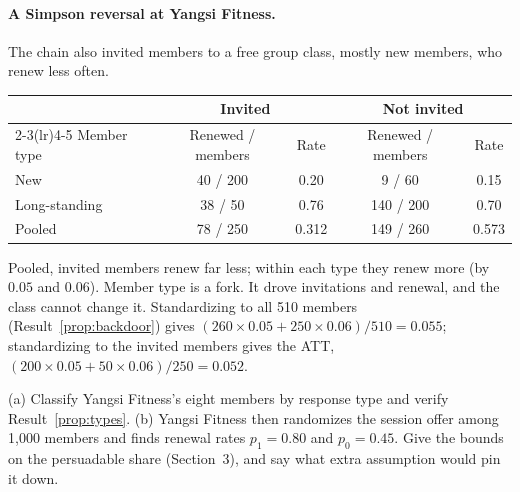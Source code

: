 \documentclass[11pt]{article}
\begin{document}
\paragraph{A Simpson reversal at Yangsi Fitness.} The chain also invited members to a free group class, mostly
new members, who renew less often.
\begin{center}
\begin{tabular}{lcccc}
\toprule
 & \multicolumn{2}{c}{Invited} & \multicolumn{2}{c}{Not invited} \\
\cmidrule(lr){2-3}\cmidrule(lr){4-5}
Member type & Renewed / members & Rate & Renewed / members & Rate \\
\midrule
New & 40 / 200 & 0.20 & 9 / 60 & 0.15 \\
Long-standing & 38 / 50 & 0.76 & 140 / 200 & 0.70 \\
\midrule
Pooled & 78 / 250 & 0.312 & 149 / 260 & 0.573 \\
\bottomrule
\end{tabular}
\end{center}
Pooled, invited members renew far less; within each type they renew more (by $0.05$ and $0.06$). Member
type is a fork. It drove invitations and renewal, and the class cannot change it. Standardizing to all 510
members (Result~\ref{prop:backdoor}) gives $(260 \times 0.05 + 250 \times 0.06)/510 = 0.055$; standardizing to
the invited members gives the ATT, $(200 \times 0.05 + 50 \times 0.06)/250 = 0.052$.

\begin{center}
\end{center}

\begin{exercise}[computation]
(a) Classify Yangsi Fitness's eight members by response type and verify Result~\ref{prop:types}. (b) Yangsi Fitness then
randomizes the session offer among 1{,}000 members and finds renewal rates $p_1 = 0.80$ and $p_0 = 0.45$.
Give the bounds on the persuadable share (Section~3), and say what extra assumption would pin it down.
\end{exercise}
\end{document}
